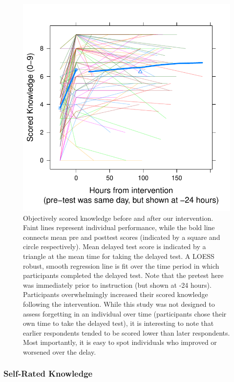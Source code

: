 \begin{figure}
    \centering
    \includegraphics{RPP-mech-scored.pdf}
    \caption{Objectively scored knowledge before and after our intervention.
        Faint lines represent individual performance, while the bold line
        connects mean pre and posttest scores (indicated by a square and circle
        respectively). Mean delayed test score is indicated by a triangle at the
        mean time for taking the delayed test. A LOESS robust, smooth regression
        line is fit over the time period in which participants completed the
        delayed test.  Note that the pretest here was immediately prior to
        instruction (but shown at -24 hours). Participants overwhelmingly
        increased their scored knowledge following the intervention. While this
        study was not designed to assess forgetting in an individual over time
        (participants chose their own time to take the delayed test), it is
        interesting to note that earlier respondents tended to be scored lower
        than later respondents.  Most importantly, it is easy to spot
        individuals who improved or worsened over the delay.}
    \label{fig:RPP-mech-scored}
\end{figure}

\subsubsection{Self-Rated Knowledge}

